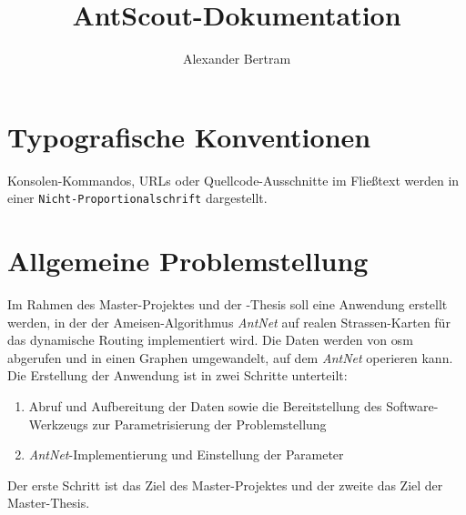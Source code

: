\documentclass[
  a4paper,
  10pt
]{scrreprt}
\author{Alexander Bertram}
\title{AntScout-Dokumentation}
\begin{document}
\maketitle



\printglossary[
  title = Abkürzungsverzeichnis,
  toctitle = Abkürzungsverzeichnis
]

\chapter{Typografische Konventionen}
\label{chap:typografische-konventionen}

Konsolen-Kommandos, URLs oder Quellcode-Ausschnitte im Fließtext werden in einer \texttt{Nicht-Proportionalschrift} dargestellt.

\chapter{Allgemeine Problemstellung}
\label{chap:allgemeine-problemstellung}

Im Rahmen des Master-Projektes und der -Thesis soll eine Anwendung erstellt werden, in der der Ameisen-Algorithmus \textit{AntNet} auf realen Strassen-Karten für das dynamische Routing implementiert wird.
Die Daten werden von \gls{osm} abgerufen und in einen Graphen umgewandelt, auf dem \textit{AntNet} operieren kann.
Die Erstellung der Anwendung ist in zwei Schritte unterteilt:

\begin{enumerate}
  \item Abruf und Aufbereitung der Daten sowie die Bereitstellung des Software-Werkzeugs zur Parametrisierung der Problemstellung
  \item \textit{AntNet}-Implementierung und Einstellung der Parameter
\end{enumerate}

Der erste Schritt ist das Ziel des Master-Projektes und der zweite das Ziel der Master-Thesis.






\end{document}
